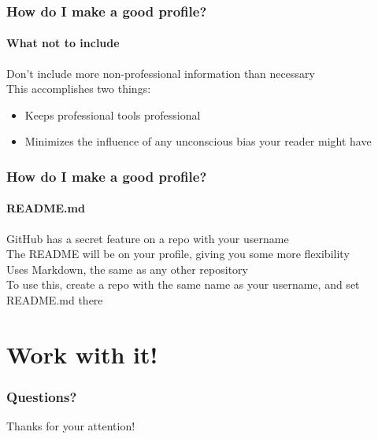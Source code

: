 \documentclass{beamer}
\begin{document}
\begin{frame}
  \frametitle{How do I make a good profile?}
  \framesubtitle{What not to include}
  Don't include more non-professional information than necessary\\\pause\vspace{0.25em}
  This accomplishes two things:
  \begin{itemize}[<+->]
    \item Keeps professional tools professional
    \item Minimizes the influence of any unconscious bias your reader might have
  \end{itemize}
\end{frame}

\begin{frame}
  \frametitle{How do I make a good profile?}
  \framesubtitle{README.md}
  GitHub has a secret feature on a repo with your username\\\vspace{0.25em}
  The README will be on your profile, giving you some more flexibility\\\vspace{0.25em}
  Uses Markdown, the same as any other repository\\\pause\vspace{0.25em}
  To use this, create a repo with the same name as your username, and set README.md there
\end{frame}

\section{Work with it!} %
\begin{frame}
  \frametitle{Questions?}
  Thanks for your attention!
\end{frame}
\end{document}
